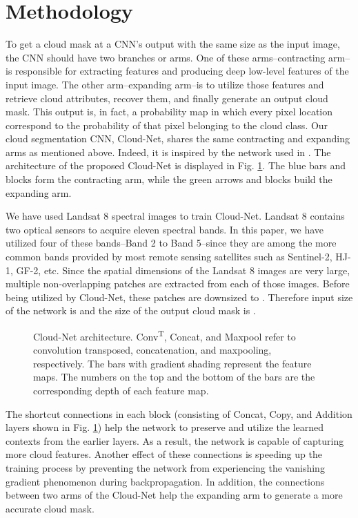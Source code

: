 \documentclass{article}
\begin{document}
\section{Methodology}
\label{sec:format}
To get a cloud mask at a CNN's output with the same size as the input image, the CNN should have two branches or arms. One of these arms--contracting arm--is responsible for extracting features and producing deep low-level features of the input image. The other arm--expanding arm--is to utilize those features and retrieve cloud attributes, recover them, and finally generate an output cloud mask. This output is, in fact, a probability map in which every pixel location correspond to the probability of that pixel belonging to the cloud class. Our cloud segmentation CNN, Cloud-Net, shares the same contracting and expanding arms as mentioned above. Indeed, it is inspired by the network used in \cite{mymmsp_shadow}. The architecture of the proposed Cloud-Net is displayed in Fig. \ref{fig:arch}. The blue bars and blocks form the contracting arm, while the green arrows and blocks build the expanding arm.

We have used Landsat 8 spectral images to train Cloud-Net. Landsat 8 contains two optical sensors to acquire eleven spectral bands. In this paper, we have utilized four of these bands--Band 2 to Band 5--since they are among the more common bands provided by most remote sensing satellites such as Sentinel-2, HJ-1, GF-2, etc. Since the spatial dimensions of the Landsat 8 images are very large, multiple non-overlapping  patches are extracted from each of those images. Before being utilized by Cloud-Net, these patches are downsized to . Therefore input size of the network is  and the size of the output cloud mask is .

\begin{figure}[t]
\begin{minipage}[b]{1.0\linewidth}
  \centering
  \centerline{}
\end{minipage}
\caption{\footnotesize Cloud-Net architecture. Conv\textsuperscript{T}, Concat, and Maxpool refer to convolution transposed, concatenation, and maxpooling, respectively. The bars with gradient shading represent the feature maps. The numbers on the top and the bottom of the bars are the corresponding depth of each feature map.}
\label{fig:arch}
\vspace{-4mm}
\end{figure}


The shortcut connections in each block (consisting of Concat, Copy, and Addition layers shown in Fig. \ref{fig:arch}) help the network to preserve and utilize the learned contexts from the earlier layers. As a result, the network is capable of capturing more cloud features. Another effect of these connections is speeding up the training process by preventing the network from experiencing the vanishing gradient  phenomenon during backpropagation. In addition, the connections between two arms of the Cloud-Net help the expanding arm to generate a more accurate cloud mask.
\end{document}
